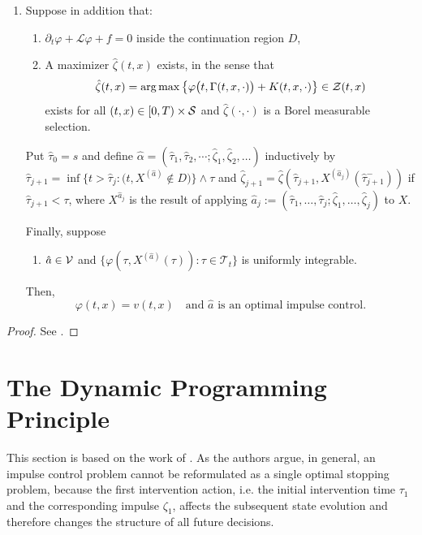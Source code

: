 \begin{theorem}
\begin{enumerate}[label=(\alph*)]
        \item Suppose in addition that:
        \begin{enumerate}[label=(\roman*), start=10]
            \item $\partial_t \varphi + \mathcal{L}\varphi + f = 0$ inside the continuation region $D$,
            \item A maximizer $\hat{\zeta}(t,x)$ exists, in the sense that
            \begin{equation*}
                \hat{\zeta}(t,x) = \operatorname*{arg\,max} \big\{\varphi\big(t, \Gamma(t,x,\cdot)\big) + K(t,x,\cdot) \big\} \in \mathcal{Z}(t,x) 
            \end{equation*}
            exists for all $(t,x) \in [0,T) \times \mathcal{S}$ and $\hat{\zeta}(\cdot, \cdot)$ is a Borel measurable selection.
        \end{enumerate}
        Put $\hat \tau_0 = s$ and define $\hat \alpha= (\hat \tau_1, \hat \tau_2, \cdots; \hat \zeta_1, \hat \zeta_2, \ldots)$ inductively by \newline $\hat \tau_{j+1} = \inf \{ t > \hat \tau_j: \big( t, X^{(\hat a)} \notin D \big) \} \wedge \tau$ and $\hat \zeta_{j+1} = \hat \zeta(\hat \tau_{j+1}, X^{(\hat a_j)}(\hat \tau_{j+1}^-))$ if $\hat \tau_{j+1} < \tau$, where $X^{\hat a_j}$ is the result of applying $\hat a_j:=(\hat \tau_1, \ldots, \hat \tau_j; \hat \zeta_1, \ldots, \hat \zeta_j)$ to $X$. 
        
        Finally, suppose 
        \begin{enumerate}[label=(\roman*), start=12]
            \item $\hat a \in \mathcal{V}$ and $\{\varphi(\tau,X^{(\hat a)}(\tau)): \tau \in \mathcal{T}_t\}$ is uniformly integrable.
        \end{enumerate}
        Then,
        \begin{equation}
            \varphi(t,x) = v(t,x) \quad \text{and } \hat a \text{ is an optimal impulse control}.
            \label{eqn: ØS theorem 9.2, second ineq}
        \end{equation}
    \end{enumerate}
\end{theorem}
\begin{proof}
    See \cite[pp.242-243]{oksendal2007applied}.
\end{proof}


\section{The Dynamic Programming Principle}
\label{section: Dynamic Programming Principle and Related Results}
This section is based on the work of \textcite[Chapter 10.1]{oksendal2007applied}. As the authors argue, in general, an impulse control problem cannot be reformulated as a single optimal stopping problem, because the first intervention action, i.e. the initial intervention time $\tau_1$ and the corresponding impulse $\zeta_1$, affects the subsequent state evolution and therefore changes the structure of all future decisions.

